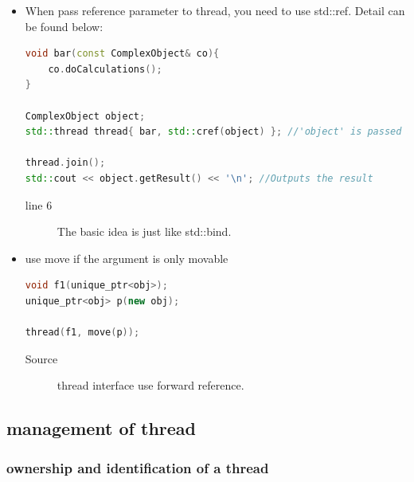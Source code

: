 \documentclass[a4paper,11pt,twoside]{book}
\begin{document}
\begin{itemize}
	\item When pass reference parameter to thread, you need to use std::ref. Detail can be found below:
\begin{lstlisting}[frame=single, language=c++]
void bar(const ComplexObject& co){
	co.doCalculations();
}

ComplexObject object;
std::thread thread{ bar, std::cref(object) }; //'object' is passed as const&

thread.join();
std::cout << object.getResult() << '\n'; //Outputs the result
\end{lstlisting}

\begin{description}
	\item[line 6] The basic idea is just like std::bind. 
\end{description}

\item use move if the argument is only movable
\begin{lstlisting}[frame=single, language=c++]
void f1(unique_ptr<obj>);
unique_ptr<obj> p(new obj);

thread(f1, move(p));
\end{lstlisting}
\begin{description}
	\item[Source] thread interface use forward reference. 
\end{description}

\end{itemize}


\subsection{management of thread}
\subsubsection{ownership and identification of a thread}
\end{document}
